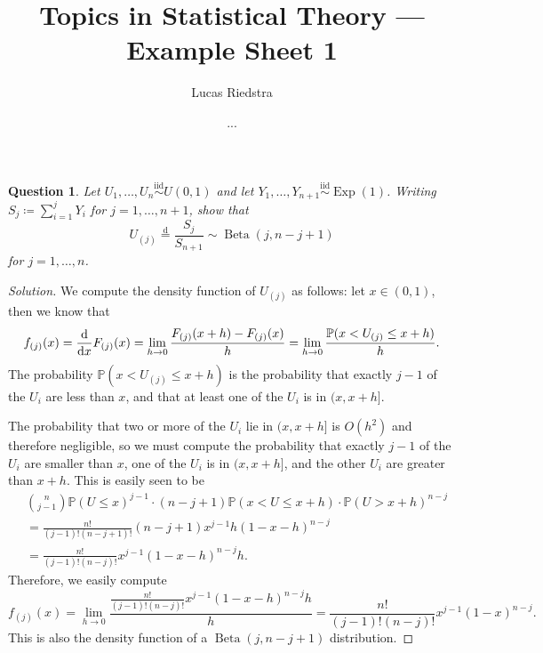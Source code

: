 \documentclass{article}
\title{Topics in Statistical Theory --- Example Sheet 1} %
\author{Lucas Riedstra}
\date{...} %
\theoremstyle{plain}
\newtheorem{question}{Question}
\theoremstyle{remark}
\newenvironment{solution}{\begin{proof}[Solution]\renewcommand\qedsymbol{}}{\end{proof}}
\newcommand{\Bb}{\mathbb}
\newcommand{\Rm}{\mathrm}
\newcommand{\PP}{\Bb P}
\newcommand\ceq\coloneqq %
\newcommand\deq{\overset{\Rm{d}}=}
\newcommand\iid{\overset{\Rm{iid}}{\sim}}
\DeclareMathOperator\Exp{Exp}
\DeclareMathOperator\Beta{Beta}
\begin{document}
\maketitle

\begin{question}
    Let $U_1, \dotsc, U_n \iid U(0, 1)$ and let $Y_1, \dotsc, Y_{n+1} \iid \Exp(1)$. Writing $S_j \ceq \sum_{i=1}^j Y_i$ for $j = 1, \dotsc, n+1$, show that
    \[
    U_{(j)} \deq \frac{S_j}{S_{n+1}} \sim \Beta(j, n - j + 1)
    \]
    for $j = 1, \dotsc, n$. 
\end{question}

\begin{solution}
%
%

We compute the density function of $U_{(j)}$ as follows: let $x \in (0, 1)$, then we know that 
\[
f_{(j)}(x) = \dv{x} F_{(j)}(x) = \lim_{h\to 0} \frac{F_{(j)}(x+h) - F_{(j)}(x)}{h} = \lim_{h \to 0} \frac{\PP(x < U_{(j)} \leq x + h)}{h}. 
\]
The probability $\PP(x < U_{(j)} \leq x + h)$ is the probability that exactly $j-1$ of the $U_{i}$ are less than $x$, and that at least one of the $U_{i}$ is in $(x, x+ h]$. 

The probability that two or more of the $U_{i}$ lie in $(x, x+h]$ is $O(h^2)$ and therefore negligible, so we must compute the probability that exactly $j-1$ of the $U_{i}$ are smaller than $x$, one of the $U_{i}$ is in $(x, x+h]$, and the other $U_{i}$ are greater than $x+h$. This is easily seen to be
\begin{align*}
&\binom{n}{j-1} \PP(U \leq x)^{j-1} \cdot (n - j + 1) \PP(x < U \leq x + h) \cdot \PP(U > x + h)^{n-j} \\
&= \frac{n!}{(j-1)!(n-j+1)!} (n-j+1) x^{j-1} h (1 - x - h)^{n-j} \\
&= \frac{n!}{(j-1)!(n-j)!} x^{j-1} (1-x-h)^{n-j} h. 
\end{align*}
Therefore, we easily compute
\[
f_{(j)}(x) = \lim_{h \to 0} \frac{\frac{n!}{(j-1)!(n-j)!} x^{j-1} (1-x-h)^{n-j} h}{h} = \frac{n!}{(j-1)!(n-j)!} x^{j-1} (1-x)^{n-j}. 
\]
This is also the density function of a $\Beta(j, n-j+1)$ distribution. 


\end{solution}
\end{document}
